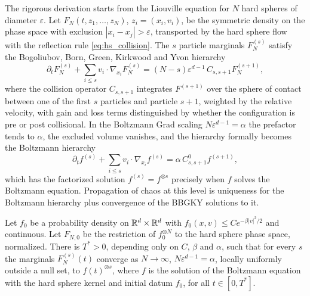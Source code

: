 The rigorous derivation starts from the Liouville equation for $N$ hard spheres of diameter $\varepsilon$. Let $F_N(t,z_1,\dots,z_N)$, $z_i = (x_i,v_i)$, be the symmetric density on the phase space with exclusion $|x_i-x_j|>\varepsilon$, transported by the hard sphere flow with the reflection rule \eqref{eq:hs_collision}. The $s$ particle marginals $F^{(s)}_N$ satisfy the Bogoliubov, Born, Green, Kirkwood and Yvon hierarchy
\[
\partial_tF^{(s)}_N+\sum_{i\leq s}v_i\cdot\nabla_{x_i}F^{(s)}_N = (N-s)\varepsilon^{d-1}\,C_{s,s+1}F^{(s+1)}_N,
\]
where the collision operator $C_{s,s+1}$ integrates $F^{(s+1)}$ over the sphere of contact between one of the first $s$ particles and particle $s+1$, weighted by the relative velocity, with gain and loss terms distinguished by whether the configuration is pre or post collisional. In the Boltzmann Grad scaling $N\varepsilon^{d-1} = \alpha$ the prefactor tends to $\alpha$, the excluded volume vanishes, and the hierarchy formally becomes the Boltzmann hierarchy
\[
\partial_tf^{(s)}+\sum_{i\leq s}v_i\cdot\nabla_{x_i}f^{(s)} = \alpha\,C^0_{s,s+1}f^{(s+1)},
\]
which has the factorized solution $f^{(s)} = f^{\otimes s}$ precisely when $f$ solves the Boltzmann equation. Propagation of chaos at this level is uniqueness for the Boltzmann hierarchy plus convergence of the BBGKY solutions to it.

\begin{theorem}[Lanford]
\label{thm:lanford}
Let $f_0$ be a probability density on $\mathbb{R}^d\times\mathbb{R}^d$ with $f_0(x,v)\leq Ce^{-\beta|v|^2/2}$ and continuous. Let $F_{N,0}$ be the restriction of $f_0^{\otimes N}$ to the hard sphere phase space, normalized. There is $T^*>0$, depending only on $C$, $\beta$ and $\alpha$, such that for every $s$ the marginals $F^{(s)}_N(t)$ converge as $N\to\infty$, $N\varepsilon^{d-1} = \alpha$, locally uniformly outside a null set, to $f(t)^{\otimes s}$, where $f$ is the solution of the Boltzmann equation with the hard sphere kernel and initial datum $f_0$, for all $t\in[0,T^*]$.
\end{theorem}

